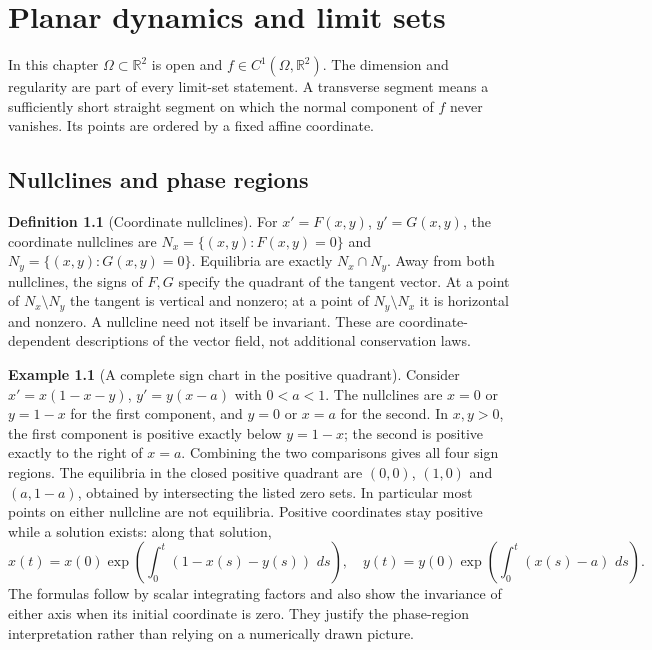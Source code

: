 \documentclass[11pt,oneside]{book}
\theoremstyle{definition}
\newtheorem{definition}[theorem]{Definition}
\newtheorem{example}[theorem]{Example}
\theoremstyle{remark}\newtheorem{remark}[theorem]{Remark}
\newcommand{\R}{\mathbb R}\newcommand{\C}{\mathbb C}
\newcommand{\dd}{\,d}\newcommand{\id}{\operatorname{id}}
\begin{document}


\chapter{Planar dynamics and limit sets}\label{ch:d13-13}

In this chapter \(\Omega\subset\R^2\) is open and \(f\in C^1(\Omega,\R^2)\).
The dimension and regularity are part of every limit-set statement.
A transverse segment means a sufficiently short straight segment on which
the normal component of \(f\) never vanishes. Its points are ordered by a
fixed affine coordinate.

\section{Nullclines and phase regions}
\begin{definition}[Coordinate nullclines]\label{d13:13:nullclines}
For $x'=F(x,y)$, $y'=G(x,y)$, the coordinate nullclines are
$N_x=\{(x,y):F(x,y)=0\}$ and $N_y=\{(x,y):G(x,y)=0\}$.
Equilibria are exactly $N_x\cap N_y$. Away from both nullclines, the signs
of $F,G$ specify the quadrant of the tangent vector. At a point of
$N_x\setminus N_y$ the tangent is vertical and nonzero; at a point of
$N_y\setminus N_x$ it is horizontal and nonzero. A nullcline need not
itself be invariant. These are coordinate-dependent descriptions of the
vector field, not additional conservation laws.
\end{definition}

\begin{example}[A complete sign chart in the positive quadrant]
\label{d13:13:nullcline-example}
Consider $x'=x(1-x-y)$, $y'=y(x-a)$ with $0<a<1$.
The nullclines are $x=0$ or $y=1-x$ for the first component, and
$y=0$ or $x=a$ for the second. In $x,y>0$, the first component is
positive exactly below $y=1-x$; the second is positive exactly to the
right of $x=a$. Combining the two comparisons gives all four sign
regions. The equilibria in the closed positive quadrant are
$(0,0)$, $(1,0)$ and $(a,1-a)$, obtained by intersecting the listed
zero sets. In particular most points on either nullcline are not
equilibria. Positive coordinates stay positive while a solution exists:
along that solution,
\[
 x(t)=x(0)\exp\!\left(\int_0^t(1-x(s)-y(s))\,\dd s\right),\quad
 y(t)=y(0)\exp\!\left(\int_0^t(x(s)-a)\,\dd s\right).
\]
The formulas follow by scalar integrating factors and also show the
invariance of either axis when its initial coordinate is zero.
They justify the phase-region interpretation rather than relying on a
numerically drawn picture.
\end{example}
\end{document}
